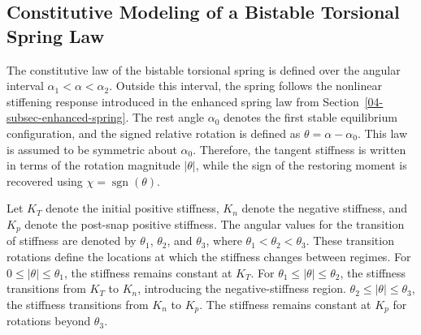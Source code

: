 \subsection{Constitutive Modeling of a Bistable Torsional Spring Law}\label{04-subsec-bistable-equations}
The constitutive law of the bistable torsional spring is defined over the angular interval \(\alpha_1 < \alpha < \alpha_2\). Outside this interval, the spring follows the nonlinear stiffening response introduced in the enhanced spring law from Section~\ref{04-subsec-enhanced-spring}. The rest angle \(\alpha_0\) denotes the first stable equilibrium configuration, and the signed relative rotation is defined as \(\theta = \alpha - \alpha_0\). This law is assumed to be symmetric about \(\alpha_0\). Therefore, the tangent stiffness is written in terms of the rotation magnitude \(|\theta|\), while the sign of the restoring moment is recovered using \(\chi = \operatorname{sgn}(\theta)\).

Let \(K_T\) denote the initial positive stiffness, \(K_n\) denote the negative stiffness, and \(K_p\) denote the post-snap positive stiffness. The angular values for the transition of stiffness are denoted by \(\theta_1\), \(\theta_2\), and \(\theta_3\), where \(\theta_1 < \theta_2 < \theta_3\). These transition rotations define the locations at which the stiffness changes between regimes. For \(0 \le |\theta| \le \theta_1\), the stiffness remains constant at \(K_T\). For \(\theta_1 \le |\theta| \le \theta_2\), the stiffness transitions from \(K_T\) to \(K_n\), introducing the negative-stiffness region. \(\theta_2 \le |\theta| \le \theta_3\), the stiffness transitions from \(K_n\) to \(K_p\). The stiffness remains constant at \(K_p\) for rotations beyond \(\theta_3\).

